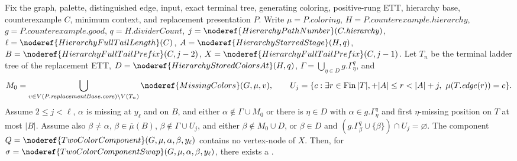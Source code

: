 \begin{lemma}
Fix the graph, palette, distinguished edge, input, exact terminal tree,
generating coloring, positive-rung ETT, hierarchy base, counterexample
\(C\), minimum context, and replacement presentation \(P\).
Write \(\mu=P.\mathit{coloring}\), \(H=P.\mathit{counterexample.hierarchy}\),
\(g=P.\mathit{counterexample.good}\), \(q=H.\mathit{dividerCount}\),
\(j=\noderef{HierarchyPathNumber}(C.\mathit{hierarchy})\),
\(\ell=\noderef{HierarchyFullTailLength}(C)\),
\(A=\noderef{HierarchyStarredStage}(H,q)\),
\(B=\noderef{HierarchyFullTailPrefix}(C,j-2)\),
\(X=\noderef{HierarchyFullTailPrefix}(C,j-1)\).
Let \(T_n\) be the terminal ladder tree of the replacement ETT,
\(D=\noderef{HierarchyStoredColorsAt}(H,q)\),
\(\Gamma=\bigcup_{\eta\in D}g.\Gamma^q_\eta\), and
\[
 M_0=\bigcup_{v\in V(P.\mathit{replacementBase.core})\setminus V(T_n)}
       \noderef{MissingColors}(G,\mu,v),\qquad
 U_j=\{c:\exists r\in\operatorname{Fin}|T|,+ |A|\le r<|A|+j,\ \mu(T.\mathit{edge}(r))=c\}.
\]
Assume \(2\le j<\ell\), \(\alpha\) is missing at \(y_\ell\) and on
\(B\), and either \(\alpha\notin\Gamma\cup M_0\) or there is
\(\eta\in D\) with \(\alpha\in g.\Gamma^q_\eta\) and first
\(\eta\)-missing position on \(T\) at most \(|B|\).
Assume also
\(\beta\ne\alpha\), \(\beta\in\overline\mu(B)\),
\(\beta\notin\Gamma\cup U_j\), and either
\(\beta\notin M_0\cup D\), or
\(\beta\in D\) and \((g.\Gamma^q_\beta\cup\{\beta\})\cap U_j=\varnothing\).
The component \(Q=\noderef{TwoColorComponent}(G,\mu,\alpha,\beta,y_\ell)\)
contains no vertex-node of \(X\).
Then, for \(\sigma=\noderef{TwoColorComponentSwap}(G,\mu,\alpha,\beta,y_\ell)\),
there exists a .
\end{lemma}
